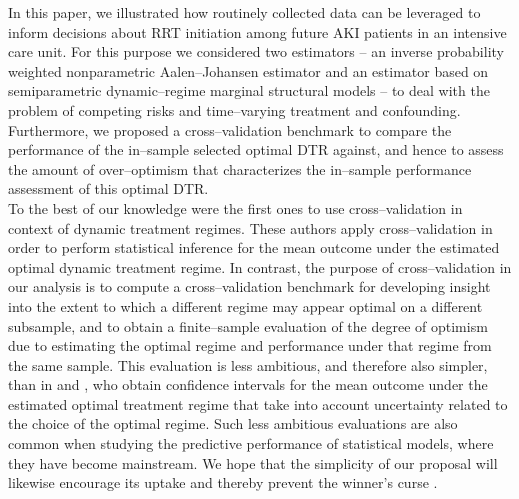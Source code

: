 \documentclass[12pt]{article}
\begin{document}
In this paper, we illustrated how routinely collected data can be leveraged to inform decisions about RRT initiation among future AKI patients in an intensive care unit. For this purpose we considered two estimators -- an inverse probability weighted nonparametric Aalen--Johansen estimator and an estimator based on semiparametric dynamic--regime marginal structural models -- to deal with the problem of competing risks and time--varying treatment and confounding. Furthermore, we proposed a cross--validation benchmark to compare the performance of the in--sample selected optimal DTR against, and hence to assess the amount of over--optimism that characterizes the in--sample performance assessment of this optimal DTR.  
\\
\indent
To the best of our knowledge \cite{VanderLaan2014} were the first ones to use cross--validation in context of dynamic treatment regimes. These authors apply cross--validation in order to perform statistical inference for the mean outcome under the estimated optimal dynamic treatment regime.  In contrast, the purpose of cross--validation in our analysis is to compute a cross--validation benchmark for developing insight into the extent to which a different regime may appear optimal on a different subsample, and to obtain a finite--sample evaluation of the degree of optimism due to estimating the optimal regime and performance under that regime from the same sample. This evaluation is less ambitious, and therefore also simpler, than in \cite{VanderLaan2014} and \cite{Andrews2018}, who obtain confidence intervals for the mean outcome under the estimated optimal treatment regime that take into account uncertainty related to the choice of the optimal regime.  Such less ambitious evaluations are also common when studying the predictive performance of statistical models, where they have become mainstream. We hope that the simplicity of our proposal will likewise encourage its uptake and thereby prevent the winner's curse \citep{Andrews2018}. 
\\
\indent
\end{document}
